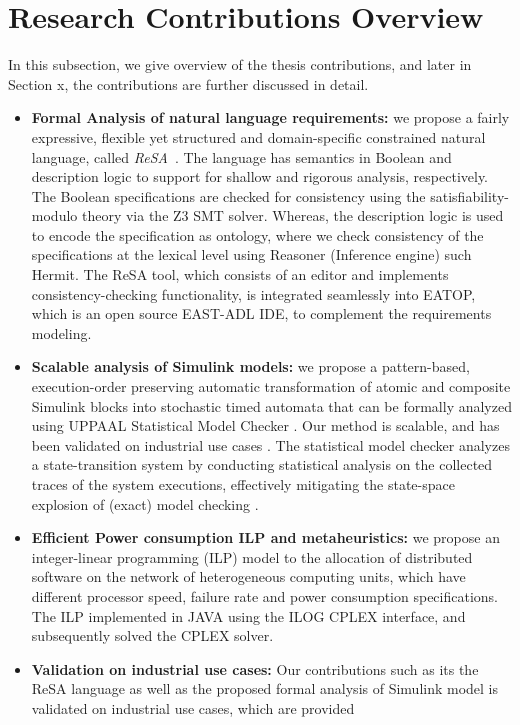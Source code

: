 \section{Research Contributions Overview}
In this subsection, we give overview of the thesis contributions, and later in Section x, the contributions are further discussed in detail.
\begin{itemize}
\item \textbf{Formal Analysis of natural language requirements:}  we propose a fairly expressive, flexible yet structured and domain-specific constrained natural language, called \textit{ReSA}~\cite{resatool}\cite{Mahmud2015ReSA:Systems}. The language has semantics in Boolean and description logic to support for shallow and rigorous analysis, respectively. The Boolean specifications are checked for consistency using the satisfiability-modulo theory via the Z3 SMT solver. Whereas, the description logic is used to encode the specification as ontology, where we check consistency of the specifications at the lexical level using Reasoner (Inference engine) such Hermit. The ReSA tool, which consists of an editor and implements consistency-checking functionality, is integrated seamlessly into EATOP, which is an open source EAST-ADL IDE, to complement the requirements modeling. 

\item \textbf{Scalable analysis of Simulink models:} we propose a pattern-based, execution-order preserving automatic transformation of atomic and composite Simulink blocks into stochastic timed automata that can be formally analyzed using UPPAAL Statistical Model Checker \cite{Bulychev2012UPPAAL-SMC:Automata}. Our method is scalable, and has been validated on industrial use cases \cite{Filipovikj2016SimulinkSystems}. The statistical model checker analyzes a state-transition system by conducting statistical analysis on the collected traces of the system executions, effectively mitigating the state-space explosion of (exact) model checking \cite{Legay2010StatisticalOverview}. 

\item \textbf{Efficient Power consumption ILP and metaheuristics:} we propose an integer-linear programming (ILP) model to the allocation of distributed software on the network of heterogeneous computing units, which have different processor speed, failure rate and power consumption specifications. The ILP implemented in JAVA using the ILOG CPLEX interface, and subsequently solved the CPLEX solver.
\item \textbf{Validation on industrial use cases: } 
Our contributions such as its the ReSA language as well as the proposed formal analysis of Simulink model is validated on industrial use cases, which are provided
\end{itemize}

